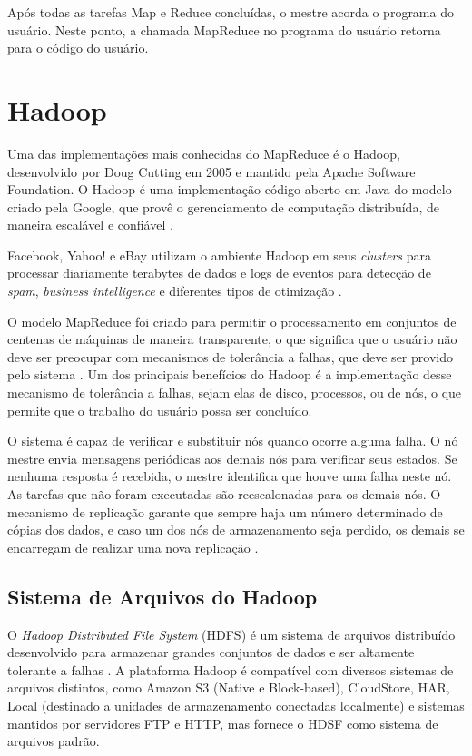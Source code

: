 Após todas as tarefas Map e Reduce concluídas, o mestre acorda o programa do usuário. Neste ponto, a chamada MapReduce no programa do usuário retorna para o código do usuário.

\section{Hadoop}
Uma das implementações mais conhecidas do MapReduce é o Hadoop, desenvolvido por Doug Cutting em 2005 e mantido pela Apache Software Foundation. O Hadoop é uma implementação código aberto em Java do modelo criado pela Google, que provê o gerenciamento de computação distribuída, de maneira escalável e confiável \cite{Hadoop:2010}.

Facebook, Yahoo! e eBay utilizam o ambiente Hadoop em seus \textit{clusters} para processar diariamente terabytes de dados e logs de eventos para detecção de \textit{spam}, \textit{business intelligence} e diferentes tipos de otimização \cite{Cherkasova:2011}.

O modelo MapReduce foi criado para permitir o processamento em conjuntos de centenas de máquinas de maneira transparente, o que significa que o usuário não deve ser preocupar com mecanismos de tolerância a falhas, que deve ser provido pelo sistema \cite{Dean:2008}. 
Um dos principais benefícios do Hadoop é a implementação desse mecanismo de tolerância a falhas, sejam elas de disco, processos, ou de nós, o que permite que o trabalho do usuário possa ser concluído.

O sistema é capaz de verificar e substituir nós quando ocorre alguma falha. O nó mestre envia mensagens periódicas aos demais nós para verificar seus estados. Se nenhuma resposta é recebida, o mestre identifica que houve uma falha neste nó. 
As tarefas que não foram executadas são reescalonadas para os demais nós. O mecanismo de replicação garante que sempre haja um número determinado de cópias dos dados, e caso um dos nós de armazenamento seja perdido, os demais se encarregam de realizar uma nova replicação \cite{Hadoop:2010}.



\subsection{Sistema de Arquivos do Hadoop}


O \textit{ Hadoop Distributed File System} (HDFS) é um sistema de arquivos distribuído desenvolvido para armazenar grandes conjuntos de dados e ser altamente tolerante a falhas \cite{Hadoop:2010}.
A plataforma Hadoop é compatível com diversos sistemas de arquivos distintos, como Amazon S3 (Native e Block-based), CloudStore, HAR, Local (destinado a unidades de armazenamento conectadas localmente) e sistemas mantidos por servidores FTP e HTTP, mas fornece o HDSF como sistema de arquivos padrão.

